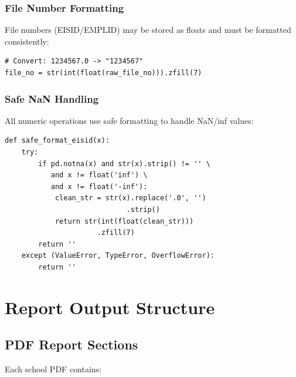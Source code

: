 \documentclass[12pt,letterpaper]{article}
\begin{document}
\subsubsection{File Number Formatting}

File numbers (EISID/EMPLID) may be stored as floats and must be formatted consistently:

\begin{tcolorbox}[colback=gray!5!white,colframe=graytext,breakable]
\begin{Verbatim}[fontsize=\small]
# Convert: 1234567.0 -> "1234567"
file_no = str(int(float(raw_file_no))).zfill(7)
\end{Verbatim}
\end{tcolorbox}

\subsubsection{Safe NaN Handling}

All numeric operations use safe formatting to handle NaN/inf values:

\begin{tcolorbox}[colback=gray!5!white,colframe=graytext,breakable]
\begin{Verbatim}[fontsize=\small]
def safe_format_eisid(x):
    try:
        if pd.notna(x) and str(x).strip() != '' \
           and x != float('inf') \
           and x != float('-inf'):
            clean_str = str(x).replace('.0', '')
                             .strip()
            return str(int(float(clean_str)))
                      .zfill(7)
        return ''
    except (ValueError, TypeError, OverflowError):
        return ''
\end{Verbatim}
\end{tcolorbox}

\section{Report Output Structure}

\subsection{PDF Report Sections}

Each school PDF contains:
\end{document}
